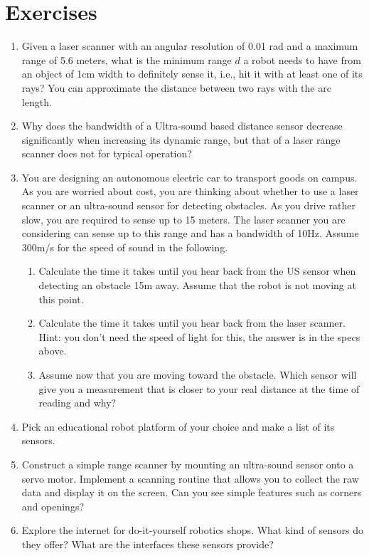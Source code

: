 \section*{Exercises}\small
\begin{enumerate}
\item Given a laser scanner with an angular resolution of 0.01 rad and a maximum range of 5.6 meters, what is the minimum range $d$ a robot needs to have from an object of 1cm width to definitely sense it, i.e., hit it with at least one of its rays? You can approximate the distance between two rays with the arc length.
\item Why does the bandwidth of a Ultra-sound based distance sensor decrease significantly when increasing its dynamic range, but that of a laser range scanner does not for typical operation?
\item You are designing an autonomous electric car to transport goods on campus. As you are worried about cost, you are thinking about whether to use a laser scanner or an ultra-sound sensor for detecting obstacles. As you drive rather slow, you are required to sense up to 15 meters. The laser scanner you are considering can sense up to this range and has a bandwidth of 10Hz. Assume 300m/s for the speed of sound in the following.
\begin{enumerate}
\item Calculate the time it takes until you hear back from the US sensor when detecting an obstacle 15m away. Assume that the robot is not moving at this point.
\item Calculate the time it takes until you hear back from the laser scanner. Hint: you don’t need the speed of light for this, the answer is in the specs above.
\item Assume now that you are moving toward the obstacle. Which sensor will give you a measurement that is closer to your real distance at the time of reading and why?
\end{enumerate}
\item Pick an educational robot platform of your choice and make a list of its sensors.
\item Construct a simple range scanner by mounting an ultra-sound sensor onto a servo motor. Implement a scanning routine that allows you to collect the raw data and display it on the screen. Can you see simple features such as corners and openings?
\item Explore the internet for do-it-yourself robotics shops. What kind of sensors do they offer? What are the interfaces these sensors provide?

\end{enumerate}
